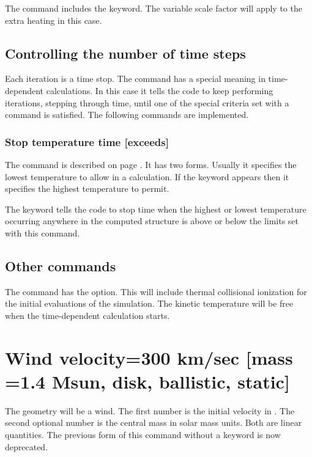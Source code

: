 \begin{shaded}
The  command includes the  keyword.
The variable scale factor will apply to the extra heating in this case.

\subsection{Controlling the number of time steps}

Each iteration is a time stop.
The  command has a special
meaning in time-dependent calculations.
In this case it tells the code to keep performing iterations,
stepping through time, until one of the special criteria set with a
 command is satisfied.
The following  commands are implemented.

\subsubsection{Stop temperature time [exceeds]}

The  command
is described on
page \pageref{sec:CommandStopTemperature}.
It has two forms.  Usually it specifies the lowest temperature
to allow in a calculation.
If the keyword  appears then it
specifies the highest temperature to permit.

The  keyword tells the code to stop time
when the highest or lowest temperature occurring anywhere
in the computed structure is above or below the limits set
with this command.

\subsection{Other commands}

The  command has the  option.
This will include thermal collisional ionization for the
initial evaluations of the simulation.
The kinetic temperature will be
free when the time-dependent calculation starts.
\end{shaded}

\section{Wind velocity=300 km/sec [mass =1.4 Msun, disk, ballistic, static]}
\label{sec:CommandWind}

The geometry will be a wind.  The first number is the initial velocity
in \kmps.  The second optional number is the central mass in solar
mass units.  Both are linear quantities.  The previous form of this
command without a  keyword is now
deprecated.

